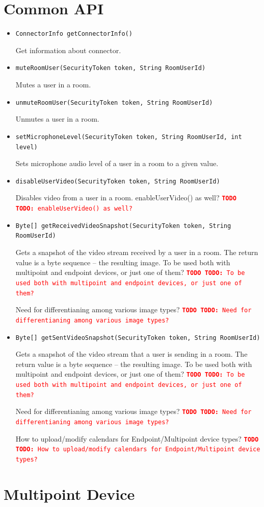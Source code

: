 \documentclass[a4paper]{report}
\newenvironment{Api}{\begin{itemize}}{\end{itemize}}
\newcommand{\ApiCode}[1]{\lstinline[style=styleApi]|#1|}
\newcommand{\ApiItem}[1]{\item #1 %

}
\newcommand{\ApiCmd}[1]{\ApiItem{\ApiCode{#1}}}
\newcommand{\TODO}[1]{%
\def\empty{}%
\def\prvniparametr{#1}%
\ifx\prvniparametr\empty%
\begingroup\tt\textcolor{red}{\noindent\textbf{TODO}}\endgroup
\else%
\begingroup\tt\textcolor{red}{\noindent\textbf{TODO:}\ #1}\endgroup
\fi%
}
\begin{document}
\section{Common API}

\begin{Api}

\ApiCmd{ConnectorInfo getConnectorInfo()}
Get information about connector.

\ApiCmd{muteRoomUser(SecurityToken token, String RoomUserId)}
Mutes a user in a room.

\ApiCmd{unmuteRoomUser(SecurityToken token, String RoomUserId)}
Unmutes a user in a room.

\ApiCmd{setMicrophoneLevel(SecurityToken token, String RoomUserId, int level)}
Sets microphone audio level of a user in a room to a given value.

\ApiCmd{disableUserVideo(SecurityToken token, String RoomUserId)}
Disables video from a user in a room.
\TODO{enableUserVideo() as well?}

\ApiCmd{Byte[] getReceivedVideoSnapshot(SecurityToken token, String RoomUserId)}
Gets a snapshot of the video stream received by a user in a room. The return value is a byte sequence -- the resulting image.
\TODO{To be used both with multipoint and endpoint devices, or just one of them?}
\TODO{Need for differentianing among various image types?}

\ApiCmd{Byte[] getSentVideoSnapshot(SecurityToken token, String RoomUserId)}
Gets a snapshot of the video stream that a user is sending in a room. The return value is a byte sequence -- the resulting image.
\TODO{To be used both with multipoint and endpoint devices, or just one of them?}
\TODO{Need for differentianing among various image types?}

\TODO{How to upload/modify calendars for Endpoint/Multipoint device types?}

\end{Api}

\section{Multipoint Device} \label{sect:connector-api-multipoint}
\end{document}
